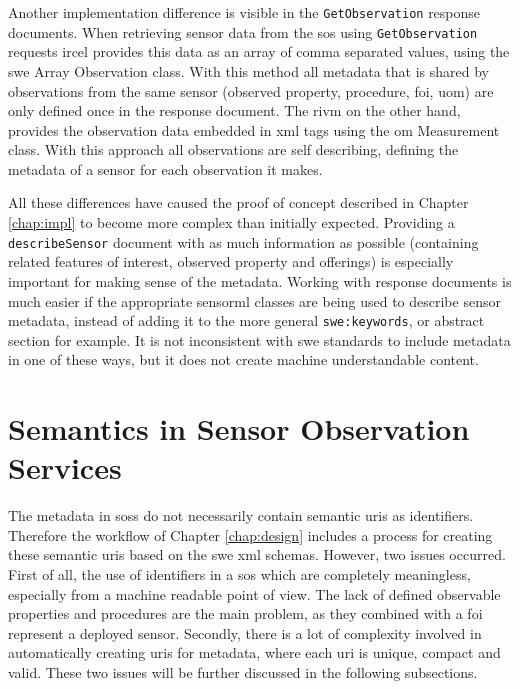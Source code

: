 \begin{sloppypar}
Another implementation difference is visible in the \texttt{GetObservation} response documents. When retrieving sensor data from the \ac{sos} using \texttt{GetObservation} requests \ac{ircel} provides this data as an array of comma separated values, using the \ac{swe} Array Observation class. With this method all metadata that is shared by observations from the same sensor (observed property, procedure, \ac{foi}, \ac{uom}) are only defined once in the response document. The \ac{rivm} on the other hand, provides the observation data embedded in \ac{xml} tags using the \ac{om} Measurement class. With this approach all observations are self describing, defining the metadata of a sensor for each observation it makes.   
\end{sloppypar}

\begin{sloppypar}
	All these differences have caused the proof of concept described in Chapter \ref{chap:impl} to become more complex than initially expected. Providing a \texttt{describeSensor} document with as much information as possible (containing related features of interest, observed property and offerings) is especially important for making sense of the metadata. Working with response documents is much easier if the appropriate \ac{sensorml} classes are being used to describe sensor metadata, instead of adding it to the more general \texttt{swe:keywords}, or abstract section for example. It is not inconsistent with \ac{swe} standards to include metadata in one of these ways, but it does not create machine understandable content. 
\end{sloppypar}


\section{Semantics in Sensor Observation Services}
The metadata in \aclp{sos} do not necessarily contain semantic \acp{uri} as identifiers. Therefore the workflow of Chapter \ref{chap:design} includes a process for creating these semantic \acp{uri} based on the \ac{swe} \ac{xml} schemas. However, two issues occurred. First of all, the use of identifiers  in a \ac{sos} which are completely meaningless, especially from a machine readable point of view. The lack of defined observable properties and procedures are the main problem, as they combined with a \ac{foi} represent a deployed sensor. Secondly, there is a lot of complexity involved in automatically creating \acp{uri} for metadata, where each \ac{uri} is unique, compact and valid. These two issues will be further discussed in the following subsections. 

